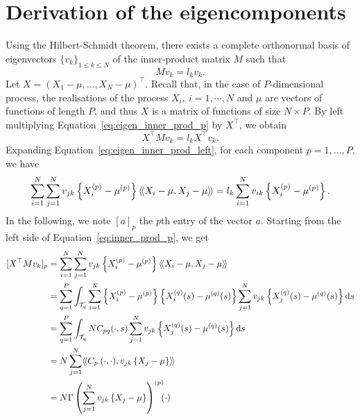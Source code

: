 \section{Derivation of the eigencomponents} %
\label{sec:derivation_of_the_eigencomponents}

Using the Hilbert-Schmidt theorem, there exists a complete orthonormal basis of eigenvectors $\{v_k\}_{1 \leq k \leq N}$ of the inner-product matrix $M$ such that
\begin{equation}\label{eq:eigen_inner_prod_p}
    Mv_k = l_kv_k.
\end{equation}
Let $X = \left(X_1 - \mu, \dots, X_N - \mu\right)^\top$. Recall that, in the case of $P$-dimensional process, the realisations of the process $X_i,~i = 1, \cdots, N$ and $\mu$ are vectors of functions of length $P$, and thus $X$ is a matrix of functions of size $N \times P$. By left multiplying Equation~\eqref{eq:eigen_inner_prod_p} by $X^\top$, we obtain
\begin{equation}\label{eq:eigen_inner_prod_left}
    X^\top M v_k = l_k X^\top v_k.
\end{equation} 
Expanding Equation~\eqref{eq:eigen_inner_prod_left}, for each component $p = 1, \dots, P$, we have
\begin{equation}\label{eq:inner_prod_p}
    \sum_{i = 1}^N \sum_{j = 1}^N v_{jk}\left\{X_i^{(p)} - \mu^{(p)}\right\}\langle\!\langle X_i - \mu, X_j - \mu\rangle\!\rangle = l_k \sum_{i = 1}^N v_{ik}\left\{X_i^{(p)} - \mu^{(p)}\right\}.
\end{equation}
In the following, we note $[a]_p$ the $p$th entry of the vector $a$. Starting from the left side of Equation~\eqref{eq:inner_prod_p}, we get
\begin{align}\label{eq:inner_prod_p_left}
[X^\top M v_k]_p &= \sum_{i = 1}^N \sum_{j = 1}^N v_{jk} \left\{X_i^{(p)} - \mu^{(p)}\right\}\langle\!\langle X_i - \mu, X_j - \mu\rangle\!\rangle\\
&= \sum_{q = 1}^P \int_{\mathcal{T}_{q}} \sum_{i = 1}^N \left\{X_i^{(p)} - \mu^{(p)}\right\} \left\{X_i^{(q)}(s) - \mu^{(q)}(s)\right\} \sum_{j = 1}^N v_{jk} \left\{X_j^{(q)}(s) - \mu^{(q)}(s)\right\} {\rm d} s \\
&= \sum_{q = 1}^P \int_{\mathcal{T}_{q}} N C_{pq}(\cdot, s)\sum_{j = 1}^N v_{jk} \left\{X_j^{(q)}(s) - \mu^{(q)}(s)\right\} {\rm d} s \\
&= N \sum_{j = 1}^N \langle\!\langle C_{p \cdot}(\cdot, \cdot), v_{jk} \left\{X_j - \mu\right\}\rangle\!\rangle \\
&= N \Gamma\left(\sum_{j = 1}^N v_{jk}\left\{X_j - \mu\right\} \right)^{(p)}\mkern-9mu(\cdot)
\end{align}
